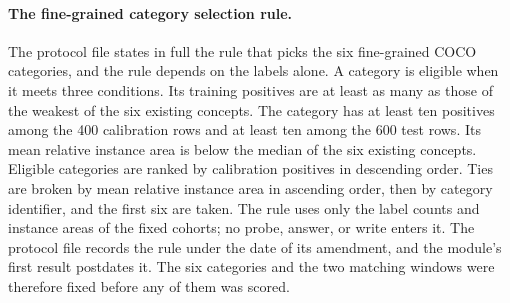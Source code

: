 \FloatBarrier

\paragraph{The fine-grained category selection rule.} The protocol file states in full the rule that picks the six fine-grained COCO categories, and the rule depends on the labels alone. A category is eligible when it meets three conditions. Its training positives are at least as many as those of the weakest of the six existing concepts. The category has at least ten positives among the 400 calibration rows and at least ten among the 600 test rows. Its mean relative instance area is below the median of the six existing concepts. Eligible categories are ranked by calibration positives in descending order. Ties are broken by mean relative instance area in ascending order, then by category identifier, and the first six are taken. The rule uses only the label counts and instance areas of the fixed cohorts; no probe, answer, or write enters it. The protocol file records the rule under the date of its amendment, and the module's first result postdates it. The six categories and the two matching windows were therefore fixed before any of them was scored.
